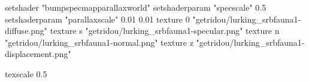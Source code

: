 setshader "bumpspecmapparallaxworld"
setshaderparam "specscale" 0.5
setshaderparam "parallaxscale" 0.01 0.01
texture 0 "getridou/lurking_srbfauna1-diffuse.png"
texture s "getridou/lurking_srbfauna1-specular.png"
texture n "getridou/lurking_srbfauna1-normal.png"
texture z "getridou/lurking_srbfauna1-displacement.png"

texscale 0.5
